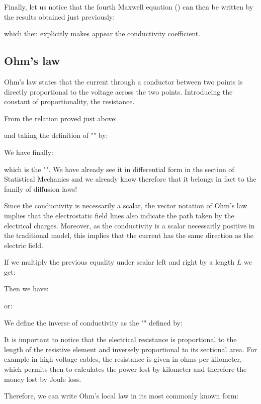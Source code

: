 	Finally, let us notice that the fourth Maxwell equation () can then be written by  the results obtained just previously:
	
	which then explicitly makes appear the conductivity coefficient.
	
	\pagebreak
	\subsection{Ohm's law}\label{ohm law}
	Ohm's law states that the current through a conductor between two points is directly proportional to the voltage across the two points. Introducing the constant of proportionality, the resistance.
	
	From the relation proved just above:
	
	and taking the definition of "" by:
	
	We have finally:
	
	which is the "". We have already see it in differential form in the section of Statistical Mechanics and we already know therefore that it belongs in fact to the family of diffusion laws!
	\begin{tcolorbox}[title=Remark,colframe=black,arc=10pt]
	Since the conductivity is necessarily a scalar, the vector notation of Ohm's law implies that the electrostatic field lines also indicate the path taken by the electrical charges. Moreover, as the conductivity is a scalar necessarily positive in the traditional model, this implies that the current has the same direction as the electric field.
	\end{tcolorbox}	
	If we multiply the previous equality under scalar left and right by a length $L$ we get:
	
	Then we have:
	
	or:
	
	We define the inverse of conductivity as the "" defined by:
	
	\begin{tcolorbox}[title=Remark,colframe=black,arc=10pt]
	It is important to notice that the electrical resistance is proportional to the length of the resistive element and inversely proportional to its sectional area. For example in high voltage cables, the resistance is given in ohms per kilometer, which permits then to calculates the power lost by kilometer and therefore the money lost by Joule loss.
	\end{tcolorbox}	
	Therefore, we can write Ohm's local law in its most commonly known form:
	
